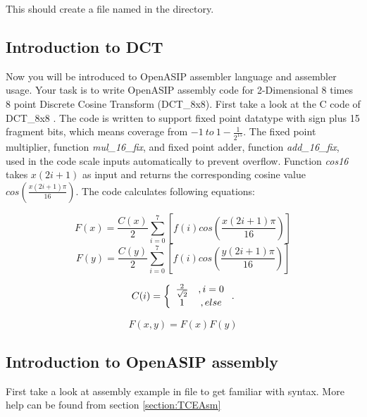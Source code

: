 \documentclass[a4paper,twoside]{tceusermanual}
\begin{document}
This should create a file named  in the directory.

\subsection{Introduction to DCT}

Now you will be introduced to OpenASIP assembler language and assembler usage.
Your task is to write OpenASIP assembly code for 2-Dimensional 8 times 8 point 
Discrete Cosine Transform (DCT\_8x8).
First take a look at the C code of DCT\_8x8
.  
The code is written to support fixed point datatype with sign plus 15 fragment
bits, which means coverage from $-1\ to\ 1-\frac{1}{2^{15}}$. The fixed point
multiplier, function \textit{mul\_16\_fix}, and fixed point adder, function
\textit{add\_16\_fix},  used in the code scale inputs automatically to prevent
overflow. Function \textit{cos16} takes $x(2i+1)$ as input and returns
the corresponding cosine value $cos\left(\frac{x(2i+1)\pi}{16}\right)$. The code calculates
following equations:

\begin{equation}
F(x) = \frac{C(x)}{2}\sum_{i = 0}^7 \left[f(i)cos\left(\frac{x
\left(2i+1\right)\pi}{16}\right)\right] \nonumber
\end{equation}
\begin{equation}
F(y) = \frac{C(y)}{2}\sum_{i = 0}^7 \left[f(i)cos\left(\frac{y
\left(2i+1\right)\pi}{16}\right)\right] \nonumber
\end{equation}

\begin{equation}
C(i) = 
\left\{
\begin{array}{c c}
\frac{2}{\sqrt2} &,  i = 0 \\
1 &,  else 
\end{array} \right . . \nonumber
\end{equation}

\begin{equation}
F(x,y) = F(x)F(y) \nonumber
\end{equation}

\subsection{Introduction to OpenASIP assembly}

First take a look at assembly example in file 
to get familiar with syntax. More help can be found from
section \ref{section:TCEAsm}
\end{document}
